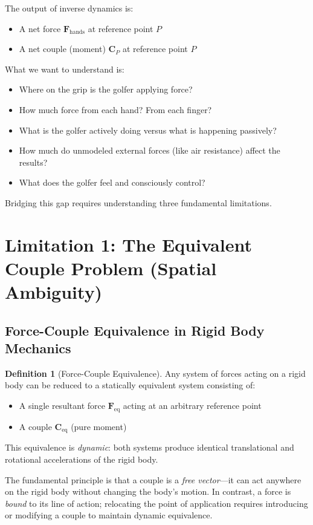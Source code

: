 \documentclass[11pt,a4paper]{article}
\newcommand{\bvec}[1]{\mathbf{#1}}
\theoremstyle{definition}
\newtheorem{definition}{Definition}[section]
\theoremstyle{plain}
\begin{document}
The output of inverse dynamics is:
\begin{itemize}
    \item A net force $\bvec{F}_{\text{hands}}$ at reference point $P$
    \item A net couple (moment) $\bvec{C}_{P}$ at reference point $P$
\end{itemize}

What we want to understand is:
\begin{itemize}
    \item Where on the grip is the golfer applying force?
    \item How much force from each hand? From each finger?
    \item What is the golfer actively doing versus what is happening passively?
    \item How much do unmodeled external forces (like air resistance) affect the results?
    \item What does the golfer feel and consciously control?
\end{itemize}

Bridging this gap requires understanding three fundamental limitations.

\section{Limitation 1: The Equivalent Couple Problem (Spatial Ambiguity)}

\subsection{Force-Couple Equivalence in Rigid Body Mechanics}

\begin{definition}[Force-Couple Equivalence]
Any system of forces acting on a rigid body can be reduced to a statically equivalent system consisting of:
\begin{itemize}
    \item A single resultant force $\bvec{F}_{\text{eq}}$ acting at an arbitrary reference point
    \item A couple $\bvec{C}_{\text{eq}}$ (pure moment) 
\end{itemize}
This equivalence is \emph{dynamic}: both systems produce identical translational and rotational accelerations of the rigid body.
\end{definition}

The fundamental principle is that a couple is a \emph{free vector}—it can act anywhere on the rigid body without changing the body's motion. In contrast, a force is \emph{bound} to its line of action; relocating the point of application requires introducing or modifying a couple to maintain dynamic equivalence.
\end{document}
